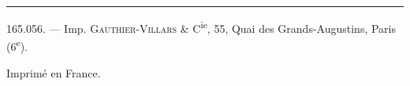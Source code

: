\hrule
165.056. --- Imp. \textsc{Gauthier-Villars} \& C\textsuperscript{ie}, 55, Quai des Grands-Augustins, Paris (6\textsuperscript{e}).

\begin{center}Imprimé en France.\end{center}

